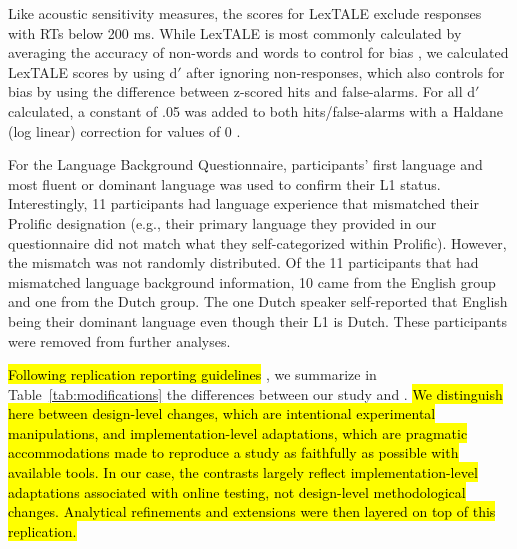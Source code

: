 Like acoustic sensitivity measures, the scores for LexTALE exclude responses with RTs below 200 ms. While LexTALE is most commonly calculated by averaging the accuracy of non-words and words to control for bias \parencite{lemhofer2012introducing}, we calculated LexTALE scores by using d$'$ after ignoring non-responses, which also controls for bias by using the difference between z-scored hits and false-alarms. For all d$'$ calculated, a constant of .05 was added to both hits/false-alarms with a Haldane (log linear) correction for values of 0 \parencite{Hautus1995}. 

For the Language Background Questionnaire, participants' first language and most fluent or dominant language was used to confirm their L1 status. Interestingly, 11 participants had language experience that mismatched their Prolific designation (e.g., their primary language they provided in our questionnaire did not match what they self-categorized within Prolific). However, the mismatch was not randomly distributed. Of the 11 participants that had mismatched language background information, 10 came from the English group and one from the Dutch group. The one Dutch speaker self-reported that English being their dominant language even though their L1 is Dutch. These participants were removed from further analyses.

\hl{Following replication reporting guidelines }\parencite{mcmanus2024}, we
summarize in Table~\ref{tab:modifications} the differences between our study and \textcite{ge2021a}. \hl{We distinguish here between design-level changes, which are intentional experimental manipulations, and implementation-level adaptations, which are pragmatic accommodations made to reproduce a study as faithfully as possible with available tools. In our case, the contrasts largely reflect implementation-level adaptations associated with online testing, not design-level methodological changes. Analytical refinements and extensions were then layered on top of this replication.}

\begin{table}[h]
    \centering
    \renewcommand{\arraystretch}{1.3}
    \caption{Key differences between Ge et al. (2021a) and the present replication.}
    \label{tab:modifications}
\end{table}